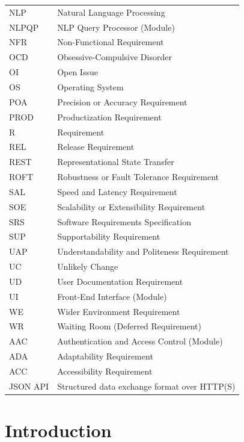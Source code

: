 \documentclass[12pt, titlepage]{article}
\begin{document}
\begin{longtable}{l l}
  NLP & Natural Language Processing \\
  NLPQP & NLP Query Processor (Module) \\
  NFR & Non-Functional Requirement \\
  OCD & Obsessive-Compulsive Disorder \\
  OI & Open Issue \\
  OS & Operating System \\
  POA & Precision or Accuracy Requirement \\
  PROD & Productization Requirement \\
  R & Requirement \\
  REL & Release Requirement \\
  REST & Representational State Transfer \\
  ROFT & Robustness or Fault Tolerance Requirement \\
  SAL & Speed and Latency Requirement \\
  SOE & Scalability or Extensibility Requirement \\
  SRS & Software Requirements Specification \\
  SUP & Supportability Requirement \\
  UAP & Understandability and Politeness Requirement \\
  UC & Unlikely Change \\
  UD & User Documentation Requirement \\
  UI & Front-End Interface (Module) \\
  WE & Wider Environment Requirement \\
  WR & Waiting Room (Deferred Requirement) \\
  AAC & Authentication and Access Control (Module) \\
  ADA & Adaptability Requirement \\
  ACC & Accessibility Requirement \\
  JSON API & Structured data exchange format over HTTP(S) \\

\end{longtable}


\newpage

\tableofcontents

\listoftables

\listoffigures

\newpage


\section{Introduction}
\end{document}
